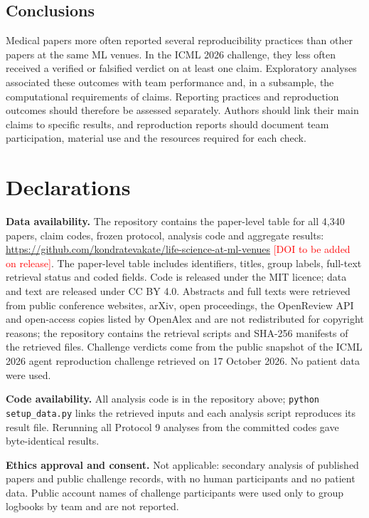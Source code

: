 \documentclass[11pt]{article}
\newcommand{\todo}[1]{\textcolor{red}{#1}}
\begin{document}
\subsection*{Conclusions}
Medical papers more often reported several reproducibility practices than other papers at the same ML venues. In the ICML 2026 challenge, they less often received a verified or falsified verdict on at least one claim. Exploratory analyses associated these outcomes with team performance and, in a subsample, the computational requirements of claims. Reporting practices and reproduction outcomes should therefore be assessed separately. Authors should link their main claims to specific results, and reproduction reports should document team participation, material use and the resources required for each check.

\section*{Declarations}
\textbf{Data availability.} The repository contains the paper-level table for all 4,340 papers, claim codes, frozen protocol, analysis code and aggregate results: \url{https://github.com/kondratevakate/life-science-at-ml-venues} \todo{[DOI to be added on release]}. The paper-level table includes identifiers, titles, group labels, full-text retrieval status and coded fields. Code is released under the MIT licence; data and text are released under CC BY 4.0. Abstracts and full texts were retrieved from public conference websites, arXiv, open proceedings, the OpenReview API and open-access copies listed by OpenAlex and are not redistributed for copyright reasons; the repository contains the retrieval scripts and SHA-256 manifests of the retrieved files. Challenge verdicts come from the public snapshot of the ICML 2026 agent reproduction challenge retrieved on 17 October 2026. No patient data were used.

\textbf{Code availability.} All analysis code is in the repository above; \texttt{python setup\_data.py} links the retrieved inputs and each analysis script reproduces its result file. Rerunning all Protocol 9 analyses from the committed codes gave byte-identical results.

\textbf{Ethics approval and consent.} Not applicable: secondary analysis of published papers and public challenge records, with no human participants and no patient data. Public account names of challenge participants were used only to group logbooks by team and are not reported.
\end{document}
